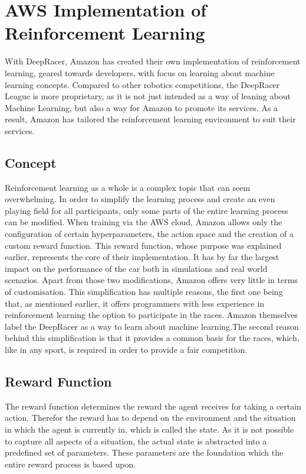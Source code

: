 \chapter{AWS Implementation of Reinforcement Learning}

With DeepRacer, Amazon has created their own implementation of reinforcement learning, geared towards developers, with focus on learning about machine learning concepts. Compared to other robotics competitions, the DeepRacer League is more proprietary, as it is not just intended as a way of leaning about Machine Learning, but also a way for Amazon to promote its services. As a result, Amazon has tailored the reinforcement learning environment to suit their services. 

\section{Concept}
Reinforcement learning as a whole is a complex topic that can seem overwhelming. In order to simplify the learning process and create an even playing field for all participants, only some parts of the entire learning process can be modified. When training via the AWS cloud, Amazon allows only the configuration of certain hyperparameters, the action space and the creation of a custom reward function. This reward function, whose purpose was explained earlier, represents the core of their implementation. It has by far the largest impact on the performance of the car both in simulations and real world scenarios. Apart from those two modifications, Amazon offers very little in terms of customisation. This simplification has multiple reasons, the first one being that, as mentioned earlier, it offers programmers with less experience in reinforcement learning the option to participate in the races. Amazon themselves label the DeepRacer as a way to learn about machine learning.The second reason behind this simplification is that it provides a common basis for the races, which, like in any sport, is required in order to provide a fair competition.

\section{Reward Function}
The reward function determines the reward the agent receives for taking a certain action. Therefor the reward has to depend on the environment and the situation in which the agent is currently in, which is called the state. As it is not possible to capture all aspects of a situation, the actual state is abstracted into a predefined set of parameters. These parameters are the foundation which the entire reward process is based upon. 

